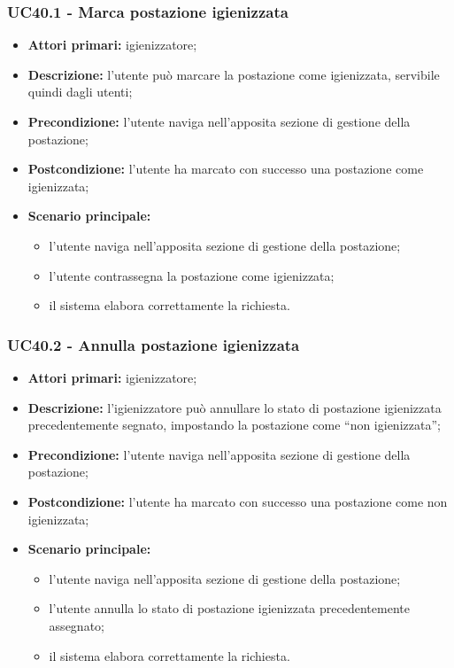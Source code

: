 \subsubsection{UC40.1 - Marca postazione igienizzata}

\begin{itemize}
\item \textbf{Attori primari:} igienizzatore;
\item \textbf{Descrizione:} l'utente può marcare la postazione come igienizzata, servibile quindi dagli utenti;
\item \textbf{Precondizione:} l'utente naviga nell’apposita sezione di gestione della postazione; 
\item \textbf{Postcondizione:} l’utente ha marcato con successo una postazione come igienizzata;
\item \textbf{Scenario principale:} 
	\begin{itemize}
		\item l'utente naviga nell’apposita sezione di gestione della postazione;		
		\item l’utente contrassegna la postazione come igienizzata;
		\item il sistema elabora correttamente la richiesta.
	\end{itemize}
\end{itemize}

\subsubsection{UC40.2 - Annulla postazione igienizzata}

\begin{itemize}
\item \textbf{Attori primari:} igienizzatore;
\item \textbf{Descrizione:} l’igienizzatore può annullare lo stato di postazione igienizzata precedentemente segnato, impostando la postazione come “non igienizzata”;
\item \textbf{Precondizione:} l'utente naviga nell’apposita sezione di gestione della postazione; 
\item \textbf{Postcondizione:} l'utente ha marcato con successo una postazione come non igienizzata;
\item \textbf{Scenario principale:} 
	\begin{itemize}
		\item l’utente naviga nell’apposita sezione di gestione della postazione;		
		\item l’utente annulla lo stato di postazione igienizzata precedentemente assegnato;
		\item il sistema elabora correttamente la richiesta.
		\end{itemize}
\end{itemize}

